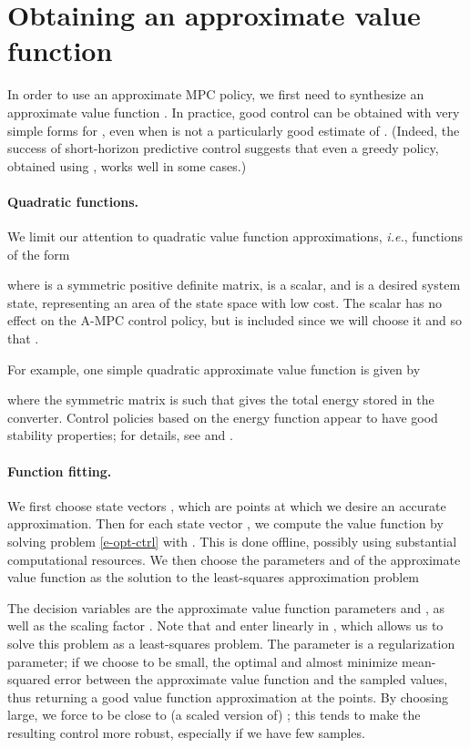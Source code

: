 \documentclass[12pt]{article}
\newcommand{\ie}{{\it i.e.}}
\begin{document}
\section{Obtaining an approximate value function}
\label{s-deriving-value-function}
In order to use an approximate MPC policy,
we first need to synthesize an approximate value function .
In practice, good control can be obtained with very simple forms for ,
even when  is not a particularly good estimate of .
(Indeed, the success of short-horizon predictive control 
suggests that even a greedy policy, obtained using , works well
in some cases.)

\paragraph{Quadratic functions.}
We limit our attention to quadratic value function approximations,
\ie, functions of the form

where  is a symmetric positive definite matrix,
 is a scalar,
and
 is a desired system state,
representing an area of the state space with low cost.
The scalar  has no effect on the A-MPC control policy, but is included
since we will choose it and  so that .

For example, one simple quadratic approximate value function is given by

where the symmetric matrix  is such that
 gives the total energy stored in the converter.
Control policies based on the energy function appear
to have good stability properties;
for details, see \cite{sanders1992lyapunov} and \cite{midya1992optimal}.














\paragraph{Function fitting.}
\label{s-function-fitting}
We first choose state vectors ,
which are points at which we desire an accurate approximation.
Then for each state vector , we compute the value function
 by solving problem \eqref{e-opt-ctrl} with .
This is done offline, possibly using substantial computational resources.
We then choose the parameters  and  of the approximate value function
as the solution to the least-squares approximation problem

The decision variables are the approximate value function parameters
 and , as well as the scaling factor .
Note that  and  enter linearly in ,
which allows us to solve this problem as a least-squares problem.
The parameter  is a regularization parameter;
if we choose  to be small,
the optimal  and  almost minimize
mean-squared error between the approximate value function
and the sampled values,
thus returning a good value function approximation at the points.
By choosing  large,
we force  to be close to (a scaled version of) ;
this tends to make the resulting control more robust,
especially if we have few samples.
\end{document}
